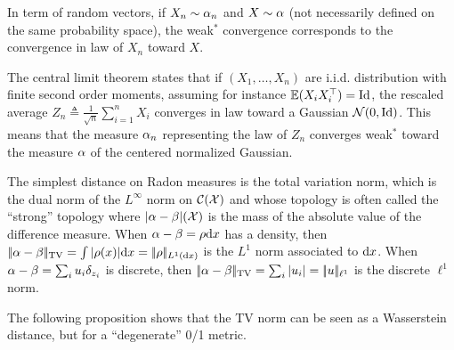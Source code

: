 In term of random vectors, if $X_n \sim \alpha_n$ and $X \sim \alpha$ (not necessarily defined on the same probability space), the weak$^*$ convergence corresponds to the convergence in law of $X_n$ toward $X$.

\begin{rem}\label{rem-clt}
	The central limit theorem states that if $(X_1,\ldots,X_n)$ are i.i.d. distribution with finite second order moments, assuming for instance $\mathbb{E}(X_i X_i^\top)=\mathrm{Id}$, the rescaled average $Z_n \triangleq \frac{1}{\sqrt{n}} \sum_{i=1}^n X_i$ converges in law toward a Gaussian $\mathcal{N}(0,\mathrm{Id})$. This means that the measure $\alpha_n$ representing the law of $Z_n$ converges weak$^*$ toward the measure $\alpha$ of the centered normalized Gaussian.
\end{rem}

\begin{defn}
The simplest distance on Radon measures is the total variation norm, which is the dual norm of the $L^\infty$ norm on $\mathcal{C}(\mathcal{X})$ and whose topology is often called the ``strong'' topology
where $|\alpha-\beta|(\mathcal{X})$ is the mass of the absolute value of the difference measure. When $\alpha-\beta=\rho \mathrm{d} x$ has a density, then $|\!| \alpha-\beta |\!|_{\operatorname{TV}}=\int |\rho(x)| \mathrm{d} x=|\!| \rho |\!|_{L^1(\mathrm{d} x)}$ is the $L^1$ norm associated to $\mathrm{d} x$. When $\alpha-\beta=\sum_i u_i \delta_{z_i}$ is discrete, then $|\!| \alpha-\beta |\!|_{\operatorname{TV}}=\sum_i |u_i|=|\!| u |\!|_{\ell^1}$ is the discrete $\ell^1$ norm. 
\end{defn}

The following proposition shows that the TV norm can be seen as a Wasserstein distance, but for a ``degenerate'' 0/1 metric.

